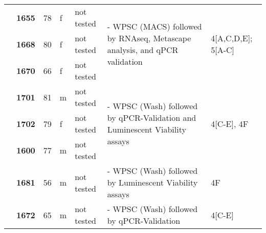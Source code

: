 {\begin{longtable}{|>{\bfseries}p{1.5cm}|>{\bfseries}p{1.2cm}|p{1.2cm}|p{1cm}|p{2.3cm}|p{6cm}|p{1.7cm}|}
    \hhline{~------}
     & 1655  & 78 & f & not tested & \multirow{3}{6cm}{- WPSC (MACS) followed by RNAseq, Metascape analysis, and qPCR validation}             & \multirow{3}{1.7cm}{4[A,C,D,E]; 5[A-C]} \\
    \hhline{~----~~}
     & 1668  & 80 & f & not tested &                                                                                                          &                                         \\
    \hhline{~----~~}
     & 1670  & 66 & f & not tested &                                                                                                          &                                         \\
    \hhline{~------}
     & 1701  & 81 & m & not tested & \multirow{3}{6cm}{- WPSC (Wash) followed by qPCR-Validation and Luminescent Viability assays}            & \multirow{3}{1.7cm}{4[C-E], 4F}         \\
    \hhline{~----~~}
     & 1702  & 79 & f & not tested &                                                                                                          &                                         \\
    \hhline{~----~~}
     & 1600  & 77 & m & not tested &                                                                                                          &                                         \\
    \hhline{~------}

     & 1681  & 56 & m & not tested & - WPSC (Wash) followed by Luminescent Viability assays                                                   & 4F                                      \\
    \hhline{~------}
     & 1672  & 65 & m & not tested & - WPSC (Wash) followed by qPCR-Validation                                                                & 4[C-E]                                  \\
\end{longtable}
}

\newpage


